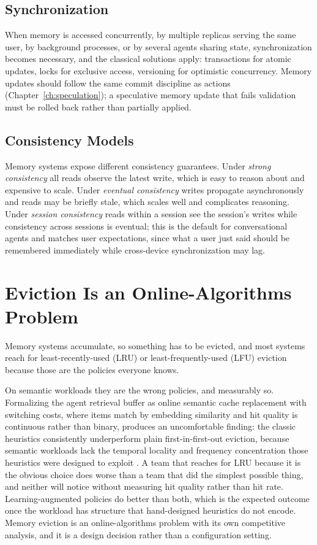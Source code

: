 \documentclass[11pt]{book}
\begin{document}
\subsection{Synchronization}

When memory is accessed concurrently, by multiple replicas serving the same user, by background processes, or by several agents sharing state, synchronization becomes necessary, and the classical solutions apply: transactions for atomic updates, locks for exclusive access, versioning for optimistic concurrency. Memory updates should follow the same commit discipline as actions (Chapter~\ref{ch:speculation}); a speculative memory update that fails validation must be rolled back rather than partially applied.

\subsection{Consistency Models}

Memory systems expose different consistency guarantees. Under \textit{strong consistency} all reads observe the latest write, which is easy to reason about and expensive to scale. Under \textit{eventual consistency} writes propagate asynchronously and reads may be briefly stale, which scales well and complicates reasoning. Under \textit{session consistency} reads within a session see the session's writes while consistency across sessions is eventual; this is the default for conversational agents and matches user expectations, since what a user just said should be remembered immediately while cross-device synchronization may lag.

\section{Eviction Is an Online-Algorithms Problem}

Memory systems accumulate, so something has to be evicted, and most systems reach for least-recently-used (LRU) or least-frequently-used (LFU) eviction because those are the policies everyone knows.

On semantic workloads they are the wrong policies, and measurably so. Formalizing the agent retrieval buffer as online semantic cache replacement with switching costs, where items match by embedding similarity and hit quality is continuous rather than binary, produces an uncomfortable finding: the classic heuristics consistently underperform plain first-in-first-out eviction, because semantic workloads lack the temporal locality and frequency concentration those heuristics were designed to exploit \cite{cachepolicy2026}. A team that reaches for LRU because it is the obvious choice does worse than a team that did the simplest possible thing, and neither will notice without measuring hit quality rather than hit rate. Learning-augmented policies do better than both, which is the expected outcome once the workload has structure that hand-designed heuristics do not encode. Memory eviction is an online-algorithms problem with its own competitive analysis, and it is a design decision rather than a configuration setting.
\end{document}
